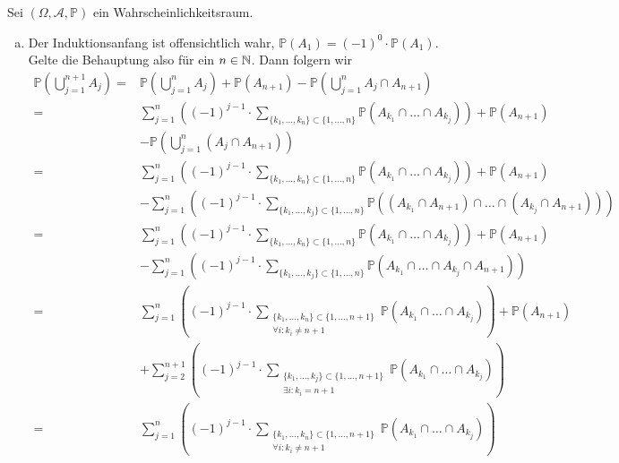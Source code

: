 \documentclass[uebung]{lecture}
\newcommand{\IP}{\mathbb{P}}
\begin{document}
\begin{aufgabe}
    Sei $(\Omega, \mathcal{A}, \mathbb{P})$ ein Wahrscheinlichkeitsraum.
    \begin{enumerate}[(a)]
        \item Der Induktionsanfang ist offensichtlich wahr, $\IP(A_1) = (-1)^0 \cdot \IP(A_1)$. Gelte die Behauptung also für ein $n\in \mathbb{N}$. Dann folgern wir
            \begin{align*}
                \IP\left(\bigcup_{j=1}^{n+1} A_j\right) =& \IP\left(\bigcup_{j=1}^{n} A_j\right) + \IP(A_{n+1}) - \IP\left(\bigcup_{j=1}^{n} A_j \cap A_{n+1}\right)\\
                =& \sum_{j = 1}^{n} \left((-1)^{j-1} \cdot \sum_{\{k_1, \dots, k_n\} \subset \{1,\dots, n\}} \IP(A_{k_1} \cap \dots \cap A_{k_j})\right) + \IP(A_{n+1})\\
                &- \IP\left(\bigcup_{j=1}^{n} (A_j \cap A_{n+1})\right)\\
                =& \sum_{j = 1}^{n} \left((-1)^{j-1} \cdot \sum_{\{k_1, \dots, k_n\} \subset \{1,\dots, n\}} \IP(A_{k_1} \cap \dots \cap A_{k_j})\right) + \IP(A_{n+1})\\
                &- \sum_{j = 1}^{n} \left((-1)^{j-1} \cdot \sum_{\{k_1,\dots, k_j\} \subset \{1,\dots, n\}} \IP((A_{k_1} \cap A_{n+1}) \cap \dots \cap (A_{k_j} \cap A_{n+1}))\right)\\
                =& \sum_{j = 1}^{n} \left((-1)^{j-1} \cdot \sum_{\{k_1, \dots, k_n\} \subset \{1,\dots, n\}} \IP(A_{k_1} \cap \dots \cap A_{k_j})\right) + \IP(A_{n+1})\\
                &- \sum_{j = 1}^{n} \left((-1)^{j-1} \cdot \sum_{\{k_1, \dots, k_j\} \subset \{1,\dots, n\}} \IP(A_{k_1} \cap \dots \cap A_{k_j} \cap A_{n+1})\right)\\
                =& \sum_{j = 1}^{n} \left((-1)^{j-1} \cdot \sum_{\substack{\{k_1, \dots, k_n\} \subset \{1,\dots, n+1\}\\\forall i\colon k_i \neq n+1}} \IP(A_{k_1} \cap \dots \cap A_{k_j})\right) + \IP(A_{n+1})\\
                &+ \sum_{j = 2}^{n+1} \left((-1)^{j-1} \cdot \sum_{\substack{\{k_1, \dots, k_j\} \subset \{1,\dots, n+1\}\\\exists i\colon k_i = n+1}} \IP(A_{k_1} \cap \dots \cap A_{k_j})\right)\\
                =& \sum_{j = 1}^{n} \left((-1)^{j-1} \cdot \sum_{\substack{\{k_1, \dots, k_n\} \subset \{1,\dots, n+1\}\\\forall i\colon k_i \neq n+1}} \IP(A_{k_1} \cap \dots \cap A_{k_j})\right)\\

\end{align*}
\end{enumerate}
\end{aufgabe}
\end{document}

